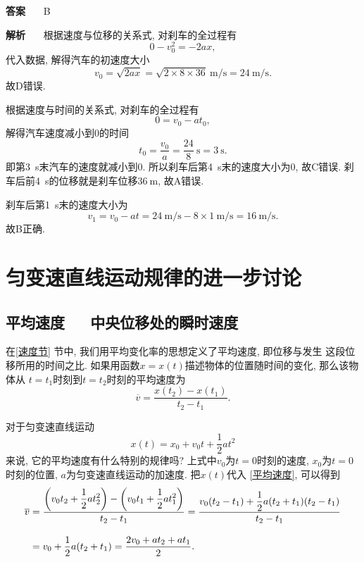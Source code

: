 \documentclass[11pt,a4paper]{ctexbook}
\newcommand{\bre}{\ \ \ }
\newcommand{\unit}[1]{\ \mathrm{#1}}
\begin{document}
\textbf{答案} \bre B

\textbf{解析} \bre 根据速度与位移的关系式, 对刹车的全过程有$$0 - v_0^2 = -2ax, $$代入数据, 解得汽车的初速度大小
$$v_0 = \sqrt{2ax} = \sqrt{2\times 8\times 36}\unit{m/s} = 24\unit{m/s}.$$
故D错误.

根据速度与时间的关系式, 对刹车的全过程有$$0 = v_0 - at_0, $$解得汽车速度减小到0的时间$$t_0 = \frac{v_0}{a} = \frac{24}{8}\unit{s}= 3\unit{s}.$$
即第3\ s末汽车的速度就减小到0. 所以刹车后第4\ s末的速度大小为0, 故C错误. 刹车后前4\ s的位移就是刹车位移$36\unit{m}$, 故A错误.

刹车后第1\ s末的速度大小为$$v_1 = v_0 - at = 24\unit{m/s} - 8\times 1\unit{m/s} = 16\unit{m/s}.$$故B正确.

\section{匀变速直线运动规律的进一步讨论}

\subsection{平均速度\bre 中央位移处的瞬时速度}

在\ref{速度节} 节中, 我们用平均变化率的思想定义了平均速度, 即位移与发生
这段位移所用的时间之比. 如果用函数$x = x(t)$描述物体的位置随时间的变化, 那么该物体从
$t = t_1$时刻到$t = t_2$时刻的平均速度为
\begin{equation}
    \overline{v} = \frac{x(t_2) - x(t_1)}{t_2 - t_1}.
    \label{平均速度}
\end{equation}

对于匀变速直线运动$$x(t) = x_0 + v_0t + \frac12at^2$$
来说, 它的平均速度有什么特别的规律吗? 上式中$v_0$为$t =0$时刻的速度, $x_0$为$t=0$时刻的位置, $a$为匀变速直线运动的加速度.
把$x(t)$代入 \eqref{平均速度}, 可以得到\vspace{10pt}
\begin{equation}
    \begin{aligned}
    \overline{v} &= \displaystyle\frac{\left(v_0t_2+\displaystyle\frac12at_2^2\right) - \left(v_0t_1+\displaystyle\frac12at_1^2\right)}{t_2 - t_1}
    = \displaystyle\frac{v_0(t_2-t_1)+\displaystyle\frac12a(t_2+t_1)(t_2-t_1)}{t_2 - t_1}\\[10pt]
    &= v_0+\frac12a(t_2+t_1) = \frac{2v_0 + at_2+at_1}{2}.
\end{aligned}
\label{pjsd1}
\vspace{15pt}
\end{equation}
\end{document}
